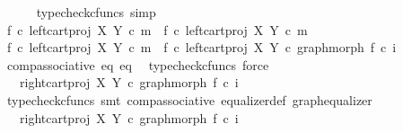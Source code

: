 \begin{isabellebody}
\ \ \ \ \isamarkupfalse%
\ {\isacharparenleft}{\kern0pt}typecheck{\isacharunderscore}{\kern0pt}cfuncs{\isacharcomma}{\kern0pt}\ simp{\isacharparenright}{\kern0pt}\isanewline
\ \ \isamarkupfalse%
\ {\isachardoublequoteopen}f{}\ {\isasymcirc}\isactrlsub c\ left{\isacharunderscore}{\kern0pt}cart{\isacharunderscore}{\kern0pt}proj\ X\ Y\ {\isasymcirc}\isactrlsub c\ m\ {\isacharequal}{\kern0pt}\ f{}\ {\isasymcirc}\isactrlsub c\ left{\isacharunderscore}{\kern0pt}cart{\isacharunderscore}{\kern0pt}proj\ X\ Y\ {\isasymcirc}\isactrlsub c\ m{\isachardoublequoteclose}\isanewline
\ \ \isamarkupfalse%
\ {\isacharminus}{\kern0pt}\ \isanewline
\ \ \ \ \isamarkupfalse%
\ {\isachardoublequoteopen}f{}\ {\isasymcirc}\isactrlsub c\ left{\isacharunderscore}{\kern0pt}cart{\isacharunderscore}{\kern0pt}proj\ X\ Y\ {\isasymcirc}\isactrlsub c\ m\ {\isacharequal}{\kern0pt}\ {\isacharparenleft}{\kern0pt}f{}\ {\isasymcirc}\isactrlsub c\ left{\isacharunderscore}{\kern0pt}cart{\isacharunderscore}{\kern0pt}proj\ X\ Y{\isacharparenright}{\kern0pt}\ {\isasymcirc}\isactrlsub c\ graph{\isacharunderscore}{\kern0pt}morph\ f{}\ {\isasymcirc}\isactrlsub c\ i{}{\isachardoublequoteclose}\isanewline
\ \ \ \ \ \ \isamarkupfalse%
\ comp{\isacharunderscore}{\kern0pt}associative{}\ eq{}\ eq{}\ \isamarkupfalse%
\ {\isacharparenleft}{\kern0pt}typecheck{\isacharunderscore}{\kern0pt}cfuncs{\isacharcomma}{\kern0pt}\ force{\isacharparenright}{\kern0pt}\isanewline
\ \ \ \ \isamarkupfalse%
\ \isamarkupfalse%
\ {\isachardoublequoteopen}{\isachardot}{\kern0pt}{\isachardot}{\kern0pt}{\isachardot}{\kern0pt}\ {\isacharequal}{\kern0pt}\ {\isacharparenleft}{\kern0pt}right{\isacharunderscore}{\kern0pt}cart{\isacharunderscore}{\kern0pt}proj\ X\ Y{\isacharparenright}{\kern0pt}\ {\isasymcirc}\isactrlsub c\ graph{\isacharunderscore}{\kern0pt}morph\ f{}\ {\isasymcirc}\isactrlsub c\ i{}{\isachardoublequoteclose}\isanewline
\ \ \ \ \ \ \isamarkupfalse%
\ {\isacharparenleft}{\kern0pt}typecheck{\isacharunderscore}{\kern0pt}cfuncs{\isacharcomma}{\kern0pt}\ smt\ comp{\isacharunderscore}{\kern0pt}associative{}\ equalizer{\isacharunderscore}{\kern0pt}def\ graph{\isacharunderscore}{\kern0pt}equalizer{}{\isacharparenright}{\kern0pt}\isanewline
\ \ \ \ \isamarkupfalse%
\ \isamarkupfalse%
\ {\isachardoublequoteopen}{\isachardot}{\kern0pt}{\isachardot}{\kern0pt}{\isachardot}{\kern0pt}\ {\isacharequal}{\kern0pt}\ {\isacharparenleft}{\kern0pt}right{\isacharunderscore}{\kern0pt}cart{\isacharunderscore}{\kern0pt}proj\ X\ Y{\isacharparenright}{\kern0pt}\ {\isasymcirc}\isactrlsub c\ graph{\isacharunderscore}{\kern0pt}morph\ f{}\ {\isasymcirc}\isactrlsub c\ i{}{\isachardoublequoteclose}\isanewline

\end{isabellebody}
